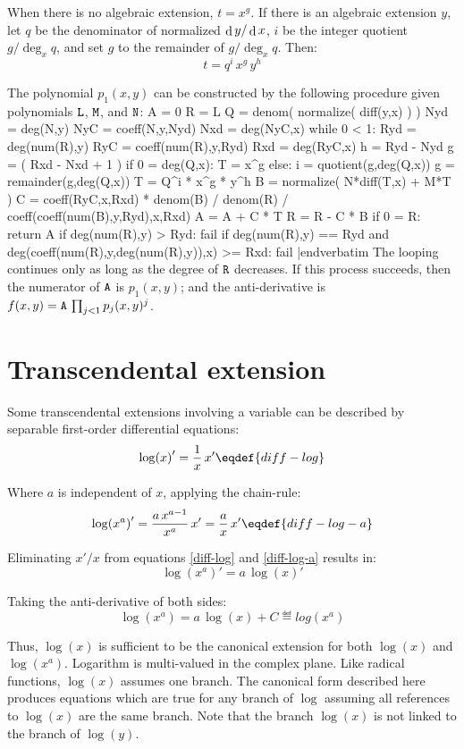 When there is no algebraic extension, $t=x^g$.  If there is an
algebraic extension $y$, let $q$ be the denominator of normalized
${\mathop{\rm d}\nolimits{y}/\mathop{\rm d}\nolimits{x}}$, $i$ be the integer quotient ${g/\deg_x{q}}$, and set
$g$ to the remainder of ${g/\deg_x{q}}$.  Then:
$$t=q^i\,x^g\,y^h$$


The polynomial $p_1(x,y)$ can be constructed by the following
procedure given polynomials ${\tt{L}}$, ${\tt{M}}$, and ${\tt{N}}$:
\medskip
\verbatim
A = 0
R = L
Q = denom( normalize( diff(y,x) ) )
Nyd = deg(N,y)
NyC = coeff(N,y,Nyd)
Nxd = deg(NyC,x)
while 0 < 1:
    Ryd = deg(num(R),y)
    RyC = coeff(num(R),y,Ryd)
    Rxd = deg(RyC,x)
    h = Ryd - Nyd
    g = ( Rxd - Nxd + 1 )
    if 0 = deg(Q,x):
        T = x^g
    else:
        i = quotient(g,deg(Q,x))
        g = remainder(g,deg(Q,x))
        T = Q^i * x^g * y^h
    B = normalize( N*diff(T,x) + M*T )
    C = coeff(RyC,x,Rxd) * denom(B) / denom(R) /
        coeff(coeff(num(B),y,Ryd),x,Rxd)
    A = A + C * T
    R = R - C * B
    if 0 = R:
        return A
    if deg(num(R),y) > Ryd:
        fail
    if deg(num(R),y) == Ryd and
       deg(coeff(num(R),y,deg(num(R),y)),x) >= Rxd:
        fail
|endverbatim
\medskip
The looping continues only as long as the degree of ${\tt{R}}$
decreases.  If this process succeeds, then the numerator of ${\tt{A}}$
is $p_1(x,y)$; and the anti-derivative is
$f(x,y)={\tt{A}}\,\prod_{j<1}p_j(x,y)^j$.

\section{Transcendental extension}

Some transcendental extensions involving a variable can be
described by separable first-order differential equations:
$${{\log(x)}'}={1\over x}\,{x'}\eqdef{diff-log}$$

Where $a$ is independent of $x$, applying the chain-rule:
$${{\log(x^a)}'}={a\,x^{a-1}\over x^a}\,{x'}={a\over x}\,{x'}\eqdef{diff-log-a}$$

Eliminating $x'/x$ from equations \eqref{diff-log} and \eqref{diff-log-a}
results in:
$${{\log(x^a)}'}=a\,{{\log(x)}'}$$

Taking the anti-derivative of both sides:
$$\log(x^a)=a\,\log(x)+C\eqdef{log(x^a)}$$

Thus, $\log(x)$ is sufficient to be the canonical extension for both
$\log(x)$ and $\log(x^a)$.  Logarithm is multi-valued in the complex
plane.  Like radical functions, $\log(x)$ assumes one branch.  The
canonical form described here produces equations which are true for
any branch of $\log$ assuming all references to $\log(x)$ are the same
branch.  Note that the branch $\log(x)$ is not linked to the
branch of $\log(y)$.

